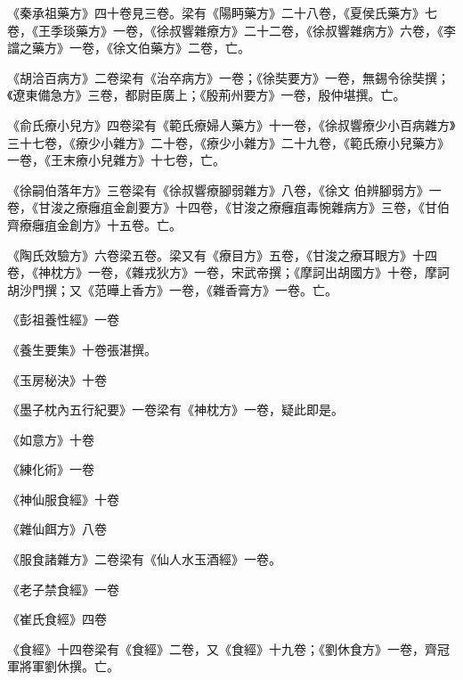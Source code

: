 \begin{pinyinscope}
 《秦承祖藥方》四十卷見三卷。梁有《陽眄藥方》二十八卷，《夏侯氏藥方》七卷，《王季琰藥方》一卷，《徐叔響雜療方》二十二卷，《徐叔響雜病方》六卷，《李譡之藥方》一卷，《徐文伯藥方》二卷，亡。



 《胡洽百病方》二卷梁有《治卒病方》一卷；《徐奘要方》一卷，無錫令徐奘撰；《遼東備急方》三卷，都尉臣廣上；《殷荊州要方》一卷，殷仲堪撰。亡。



 《俞氏療小兒方》四卷梁有《範氏療婦人藥方》十一卷，《徐叔響療少小百病雜方》三十七卷，《療少小雜方》二十卷，《療少小雜方》二十九卷，《範氏療小兒藥方》一卷，《王末療小兒雜方》十七卷，亡。



 《徐嗣伯落年方》三卷梁有《徐叔響療腳弱雜方》八卷，《徐文
 伯辨腳弱方》一卷，《甘浚之療癰疽金創要方》十四卷，《甘浚之療癰疽毒惋雜病方》三卷，《甘伯齊療癰疽金創方》十五卷。亡。



 《陶氏效驗方》六卷梁五卷。梁又有《療目方》五卷，《甘浚之療耳眼方》十四卷，《神枕方》一卷，《雜戎狄方》一卷，宋武帝撰；《摩訶出胡國方》十卷，摩訶胡沙門撰；又《范曄上香方》一卷，《雜香膏方》一卷。亡。



 《彭祖養性經》一卷



 《養生要集》十卷張湛撰。



 《玉房秘決》十卷



 《墨子枕內五行紀要》一卷梁有《神枕方》一卷，疑此即是。



 《如意方》十卷



 《練化術》一卷



 《神仙服食經》十卷



 《雜仙餌方》八卷



 《服食諸雜方》二卷梁有《仙人水玉酒經》一卷。



 《老子禁食經》一卷



 《崔氏食經》四卷



 《食經》十四卷梁有《食經》二卷，又《食經》十九卷；《劉休食方》一卷，齊冠軍將軍劉休撰。亡。




\end{pinyinscope}
